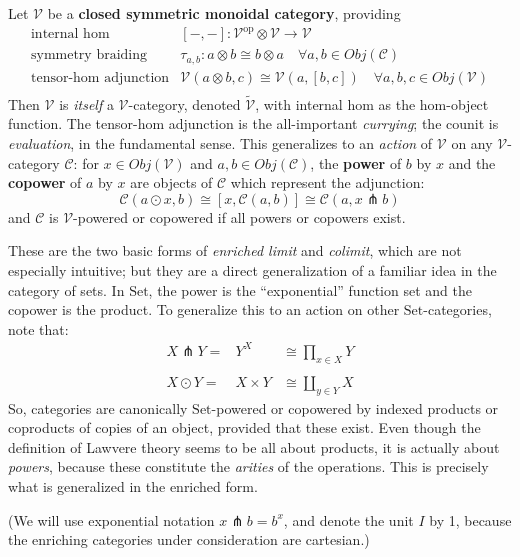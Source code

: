 \documentclass[a4paper,UKenglish]{article}
\theoremstyle{definition}
\newcommand{\Set}{\mathrm{Set}}
\newcommand{\op}{\mathrm{op}}
\newcommand{\V}{\mathscr{V}}
\newcommand{\C}{\mathscr{C}}
\newcommand{\pfk}{\pitchfork}
\begin{document}
Let $\V$ be a \textbf{closed symmetric monoidal category}, providing
\[\begin{array}{rl}
\text{internal hom} & [-,-]:\V^\op\otimes \V \to \V\\
\text{symmetry braiding} & \tau_{a,b}:a\otimes b\cong b\otimes a \quad \forall a,b \in Obj(\C)\\
\text{tensor-hom adjunction} & \V(a\otimes b,c) \cong \V(a,[b,c]) \quad \forall a,b,c \in Obj(\V)\\
\end{array}\]
Then $\V$ is \textit{itself} a $\V$-category, denoted $\tilde{\V}$, with internal hom as the hom-object function. The tensor-hom adjunction is the all-important \textit{currying}; the counit is \textit{evaluation}, in the fundamental sense. This generalizes to an \textit{action} of $\V$ on any $\V$-category $\C$: for $x \in Obj(\V)$ and $a,b \in Obj(\C)$, the \textbf{power} of $b$ by $x$ and the \textbf{copower} of $a$ by $x$ are objects of $\C$ which represent the adjunction:
\begin{equation}\label{eq:co-power}
	\C(a\odot x,b) \cong \left[x, \C(a,b)\right] \cong \C(a,x\pfk b)
\end{equation}
and $\C$ is $\V$-powered or copowered if all powers or copowers exist.

These are the two basic forms of \textit{enriched limit} and \textit{colimit}, which are not especially intuitive; but they are a direct generalization of a familiar idea in the category of sets. In $\Set$, the power is the ``exponential'' function set and the copower is the product. To generalize this to an action on other $\Set$-categories, note that:
\[\begin{array}{lcr}
	X \pfk Y = & Y^X & \cong \prod_{x\in X}Y\\
	\\
	X \odot Y = & X \times Y & \cong \coprod_{y\in Y}X
\end{array}\]
So, categories are canonically $\Set$-powered or copowered by indexed products or coproducts of copies of an object, provided that these exist. Even though the definition of Lawvere theory seems to be all about products, it is actually about \textit{powers}, because these constitute the \textit{arities} of the operations. This is precisely what is generalized in the enriched form.

(We will use exponential notation $x\pfk b = b^x$, and denote the unit $I$ by 1, because the enriching categories under consideration are cartesian.)
\end{document}
